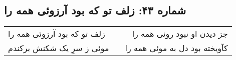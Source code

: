 \begin{center}
\section*{شماره ۴۳: زلف تو که بود آرزوئی همه را}
\label{sec:043}
\begin{longtable}{l p{0.5cm} r}
زلف تو که بود آرزوئی همه را
&&
جز دیدن او نبود روئی همه را
\\
موئی ز سرِ یک شکنش برکندم
&&
کآویخته بود دل به موئی همه را
\\
\end{longtable}
\end{center}
